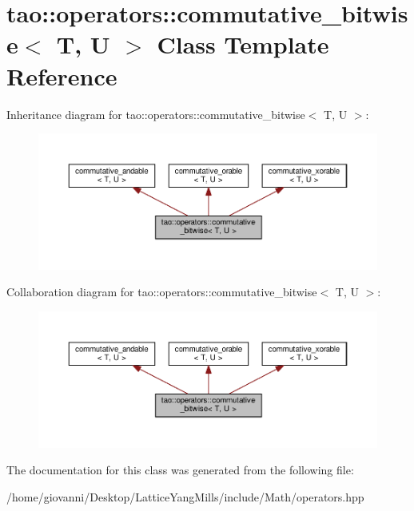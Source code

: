 \hypertarget{classtao_1_1operators_1_1commutative__bitwise}{}\section{tao\+:\+:operators\+:\+:commutative\+\_\+bitwise$<$ T, U $>$ Class Template Reference}
\label{classtao_1_1operators_1_1commutative__bitwise}


Inheritance diagram for tao\+:\+:operators\+:\+:commutative\+\_\+bitwise$<$ T, U $>$\+:\nopagebreak
\begin{figure}[H]
\begin{center}
\leavevmode
\includegraphics[width=350pt]{classtao_1_1operators_1_1commutative__bitwise__inherit__graph}
\end{center}
\end{figure}


Collaboration diagram for tao\+:\+:operators\+:\+:commutative\+\_\+bitwise$<$ T, U $>$\+:\nopagebreak
\begin{figure}[H]
\begin{center}
\leavevmode
\includegraphics[width=350pt]{classtao_1_1operators_1_1commutative__bitwise__coll__graph}
\end{center}
\end{figure}


The documentation for this class was generated from the following file\+:\begin{DoxyCompactItemize}
\item 
/home/giovanni/\+Desktop/\+Lattice\+Yang\+Mills/include/\+Math/operators.\+hpp\end{DoxyCompactItemize}
